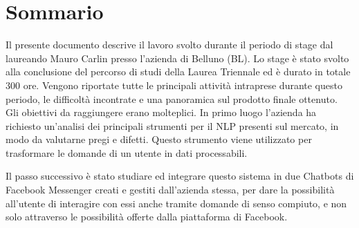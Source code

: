 
\cleardoublepage
{}
{}
\begingroup
\let\clearpage\relax
\let\cleardoublepage\relax
\let\cleardoublepage\relax

\chapter*{Sommario}

Il presente documento descrive il lavoro svolto durante il periodo di stage dal laureando Mauro Carlin presso l'azienda \azienda{} di Belluno (BL). Lo stage è stato svolto alla conclusione del percorso di studi della Laurea Triennale ed è durato in totale 300 ore. Vengono riportate tutte le principali attività intraprese durante questo periodo, le difficoltà incontrate e una panoramica sul prodotto finale ottenuto.\\
Gli obiettivi da raggiungere erano molteplici. In primo luogo l'azienda ha richiesto un'analisi dei principali strumenti per il \gls{NLP} presenti sul mercato, in modo da valutarne pregi e difetti. Questo strumento viene utilizzato per trasformare le domande di un utente in dati processabili.


Il passo successivo è stato studiare ed integrare questo sistema in due \glspl{Chatbot} di Facebook Messenger creati e gestiti dall'azienda stessa, per dare la possibilità all'utente di interagire con essi anche tramite domande di senso compiuto, e non solo attraverso le possibilità offerte dalla piattaforma di Facebook.\\

%
%

\endgroup			

\vfill